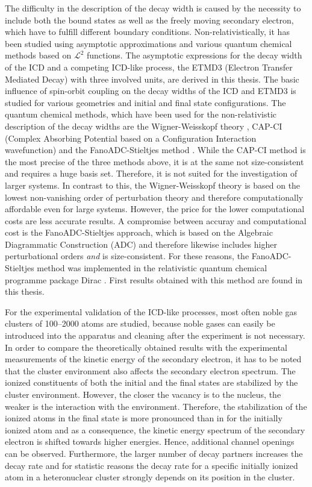 The difficulty in the description of the decay width is caused by
the necessity to include both the bound states as well as the freely
moving secondary electron, which have to fulfill different boundary conditions.
Non-relativistically, it has been studied using asymptotic
approximations \cite{Gokhberg10_1} and various quantum chemical methods based
on $\mathcal{L}^2$ functions.
The asymptotic expressions for the decay width of the \ac{ICD} and a competing
\ac{ICD}-like process, the ETMD3 (Electron Transfer Mediated Decay) with three
involved units, are derived in this thesis. The basic influence of
spin-orbit coupling on the decay widths of the \ac{ICD} and ETMD3 is studied
for various geometries and initial and final state configurations.
The quantum chemical methods, which have been used for the non-relativistic 
description of the decay widths are the Wigner-Weisskopf theory \cite{Santra02},
CAP-CI
(Complex Absorbing Potential based on a Configuration Interaction wavefunction)
\cite{SakuraiModern94,Santra01_3} and the FanoADC-Stieltjes method
\cite{Averbukh05}.
While the CAP-CI method is the most precise of the three methods above,
it is at the same
not size-consistent and requires a huge basis set. Therefore, it is not
suited for the investigation of larger systems. In contrast to this, the
Wigner-Weisskopf theory is based on the lowest non-vanishing order of perturbation
theory and therefore computationally affordable even for large systems.
However, the price for the lower
computational costs are less accurate results. A compromise between
accuray and computational cost is the FanoADC-Stieltjes approach, which
is based on the Algebraic Diagrammatic Construction (ADC) and therefore
likewise includes
higher perturbational orders \emph{and} is size-consistent.
For these reasons,
the FanoADC-Stieltjes method was implemented in the relativistic
quantum chemical programme package Dirac \cite{DIRAC13}. First results
obtained with this method are found in this thesis.

For the experimental validation of the \ac{ICD}-like processes, most often
noble gas clusters of 100--2000 atoms are studied, because noble gases can
easily be introduced into the apparatus and cleaning after the experiment is
not necessary. In order to compare the
theoretically obtained results with the experimental measurements of the
kinetic energy of the secondary electron, it has
to be noted that the cluster environment also affects the secondary electron
spectrum.
The ionized constituents of both the initial and the final states are stabilized
by the cluster environment. However, the closer the vacancy is to the nucleus,
the weaker is the interaction with the environment.
Therefore, the stabilization of the ionized atoms in the final state is more
pronounced than in for the initially ionized atom and as a consequence, the
kinetic energy spectrum of the secondary electron is shifted towards higher
energies.
Hence, additional channel openings can be observed.
Furthermore, the larger number of decay partners increases the decay rate
and for statistic reasons the decay rate for a specific initially ionized
atom in a heteronuclear cluster strongly depends on its position in the cluster.

